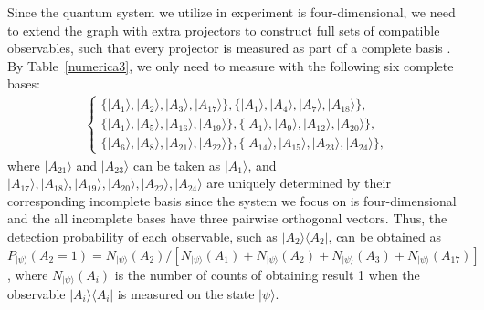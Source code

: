 \documentclass[prl,letterpaper,english,reprint,nofootinbib,aps,superscriptaddress,showpacs,showkeys]{revtex4-1}
\theoremstyle{definition}
\theoremstyle{remark}
\begin{document}
Since the quantum system we utilize in experiment is four-dimensional, we need to extend the graph with extra projectors to construct full sets of compatible observables, such that every projector is measured as part of a complete basis \cite{yxiao17}. By Table~\ref{numerica3}, we only need to measure with the following six complete bases:
\begin{eqnarray}
\left\{
  \begin{array}{ll}
    \{|A_1\rangle,|A_2\rangle,|A_3\rangle,|A_{17}\rangle\},  \{|A_1\rangle,|A_4\rangle,|A_7\rangle,|A_{18}\rangle\},\\
\{|A_1\rangle,|A_{5}\rangle,|A_{16}\rangle,|A_{19}\rangle\},
\{|A_1\rangle,|A_{9}\rangle,|A_{12}\rangle,|A_{20}\rangle\},\ \ \ \\
\{|A_{6}\rangle,|A_{8}\rangle,|A_{21}\rangle,|A_{22}\rangle\},
\{|A_{14}\rangle,|A_{15}\rangle,|A_{23}\rangle,|A_{24}\rangle\},
\end{array}
\right.
\end{eqnarray}
where $|A_{21}\rangle$ and $|A_{23}\rangle$ can be taken as $|A_{1}\rangle$, and $|A_{17}\rangle,|A_{18}\rangle,|A_{19}\rangle,|A_{20}\rangle,|A_{22}\rangle,|A_{24}\rangle$ are uniquely determined by their corresponding incomplete basis since the system we focus on is four-dimensional and the all incomplete bases have three pairwise orthogonal vectors.
 Thus, the detection probability of each observable, such as $|A_{2}\rangle\langle A_{2}|$, can be obtained as $P_{|\psi\rangle}(A_2=1)=
{N_{|\psi\rangle}(A_2)}/[N_{|\psi\rangle}(A_1)+N_{|\psi\rangle}(A_2)+N_{|\psi\rangle}(A_3)+N_{|\psi\rangle}(A_{17})]$,
where $N_{|\psi\rangle}(A_i)$ is the number of counts of obtaining result 1 when the observable $|A_{i}\rangle\langle A_{i}|$ is measured on the state $|\psi\rangle.$
\end{document}
